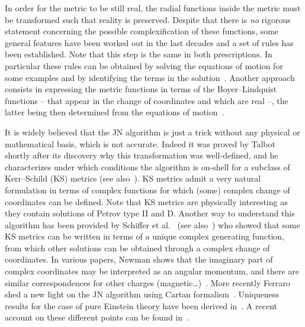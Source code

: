 In order for the metric to be still real, the radial functions inside the metric must be transformed such that reality is preserved.\footnotemark{}%
Despite that there is \emph{no} rigorous statement concerning the possible complexification of these functions, some general features have been worked out in the last decades and a set of rules has been established.
Note that this step is the same in both prescriptions.
In particular these rules can be obtained by solving the equations of motion for some examples and by identifying the terms in the solution~\cite{Demianski:1972:NewKerrlikeSpacetime}.
Another approach consists in expressing the metric functions in terms of the Boyer--Lindquist functions -- that appear in the change of coordinates and which are real --, the latter being then determined from the equations of motion~\cite{Drake:2000:UniquenessNewmanJanisAlgorithm, AzregAinou:2014:StaticRotatingConformal}.

It is widely believed that the JN algorithm is just a trick without any physical or mathematical basis, which is not accurate.
Indeed it was proved by Talbot~\cite{Talbot:1969:NewmanPenroseApproachTwisting} shortly after its discovery why this transformation was well-defined, and he characterizes under which conditions the algorithm is on-shell for a subclass of Kerr--Schild (KS) metrics (see also~\cite{Gurses:1975:LorentzCovariantTreatment}).\footnotemark{}%
KS metrics admit a very natural formulation in terms of complex functions for which (some) complex change of coordinates can be defined.
Note that KS metrics are physically interesting as they contain solutions of Petrov type II and D.
Another way to understand this algorithm has been provided by Schiffer et al.~\cite{Schiffer:1973:KerrGeometryComplexified} (see also~\cite{Finkelstein:1975:GeneralRelativisticFields}) who showed that some KS metrics can be written in terms of a unique complex generating function, from which other solutions can be obtained through a complex change of coordinates.
In various papers, Newman shows that the imaginary part of complex coordinates may be interpreted as an angular momentum, and there are similar correspondences for other charges (magnetic…)~\cite{Newman:1973:ComplexCoordinateTransformations, Newman:1974:CuriosityConcerningAngular, Newman:1976:HeavenItsProperties}.
More recently Ferraro shed a new light on the JN algorithm using Cartan formalism~\cite{Ferraro:2014:UntanglingNewmanJanisAlgorithm}.
Uniqueness results for the case of pure Einstein theory have been derived in~\cite{Drake:2000:UniquenessNewmanJanisAlgorithm}.
A recent account on these different points can be found in~\cite{Adamo:2014:KerrNewmanMetricReview}.

